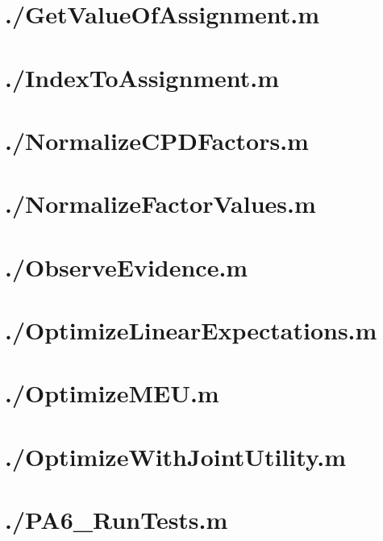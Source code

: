 \documentclass{article}
\begin{document}
\section{./GetValueOfAssignment.m}

\section{./IndexToAssignment.m}

\section{./NormalizeCPDFactors.m}

\section{./NormalizeFactorValues.m}

\section{./ObserveEvidence.m}

\section{./OptimizeLinearExpectations.m}

\section{./OptimizeMEU.m}

\section{./OptimizeWithJointUtility.m}

\section{./PA6\_RunTests.m}

\end{document}
